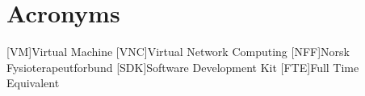 \chapter*{Acronyms}
\begin{acronym}
[VM]{Virtual Machine}
[VNC]{Virtual Network Computing}
[NFF]{Norsk Fysioterapeutforbund}
[SDK]{Software Development Kit}
[FTE]{Full Time Equivalent}
\end{acronym}

